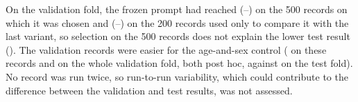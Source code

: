 On the validation fold, the frozen prompt had reached \DevVTwo{} (\DevVTwoLow--\DevVTwoHigh) on the 500 records on
which it was chosen and \DevFreshVTwo{} (\DevFreshVTwoLow--\DevFreshVTwoHigh) on the 200 records used only to compare
it with the last variant, so selection on the 500 records does not explain the lower test result (\MainAUROC). The
validation records were easier for the age-and-sex control (\DevAgeSexAll{} on these \NDevVTwoAll{} records and
\DevAgeSexFold{} on the whole validation fold, both post hoc, against \AgeSexAUROC{} on the test fold). No record was run
twice, so run-to-run variability, which could contribute to the difference between the validation and test results,
was not assessed.
